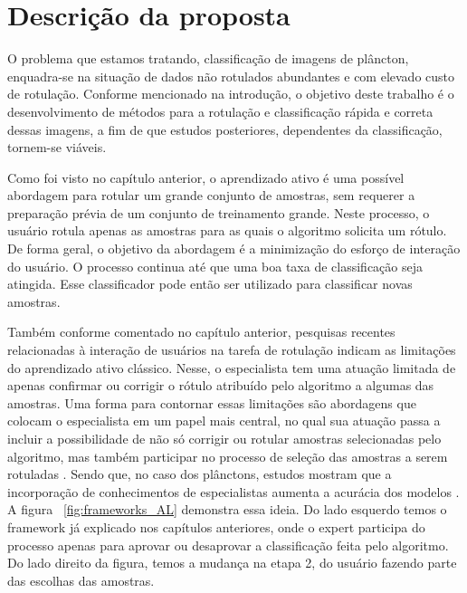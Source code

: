 \chapter{Descrição da proposta}
\label{cap:Proposta}

O problema que estamos tratando, classificação de imagens de plâncton, enquadra-se na situação de dados não rotulados abundantes e com elevado custo de rotulação. Conforme mencionado na introdução, o objetivo deste trabalho é o desenvolvimento de métodos para a rotulação e classificação rápida e correta dessas imagens, a fim de que estudos posteriores, dependentes da classificação, tornem-se viáveis. 

Como foi visto no capítulo anterior, o aprendizado ativo é uma possível abordagem para rotular um grande conjunto de amostras, sem requerer a preparação prévia de um conjunto de treinamento grande. Neste processo, o usuário rotula apenas as amostras para as quais o algoritmo solicita um rótulo. De forma geral, o objetivo da abordagem é a minimização do esforço de interação do usuário. O processo continua até que uma boa taxa de classificação seja atingida. Esse classificador pode então ser utilizado para classificar novas amostras. 

Também conforme comentado no capítulo anterior, pesquisas recentes relacionadas à interação de usuários na tarefa de rotulação indicam as limitações do aprendizado ativo clássico. Nesse, o especialista tem uma atuação limitada de apenas confirmar ou corrigir o rótulo atribuído pelo algoritmo a algumas das amostras. Uma forma para contornar essas limitações são abordagens que colocam o especialista em um papel mais central, no qual sua atuação passa a incluir a possibilidade de não só corrigir ou rotular amostras selecionadas pelo algoritmo, mas também participar no processo de seleção das amostras a serem rotuladas \citep{castro2009human, kottke2018other}. Sendo que, no caso dos plânctons, estudos mostram que a incorporação de conhecimentos de especialistas aumenta a acurácia dos modelos \citep{benfield2007rapid}. A figura ~\ref{fig:frameworks_AL} demonstra essa ideia. Do lado esquerdo temos o framework já explicado nos capítulos anteriores, onde o expert participa do processo apenas para aprovar ou desaprovar a classificação feita pelo algoritmo. Do lado direito da figura, temos a mudança na etapa 2, do usuário fazendo parte das escolhas das amostras.

